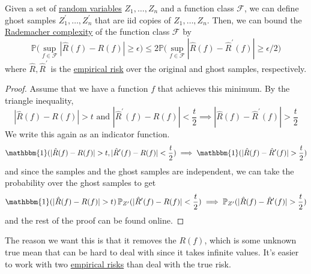   \begin{lemma}
    \label{thm:symmetrization-lemma}
    Given a set of \hyperref[prob-def:random-variable]{random variables} $Z_1, \ldots, Z_n$ and a function class $\mathcal{F}$, we can define ghost samples $Z_1^\prime, \ldots, Z_n^\prime$ that are iid copies of $Z_1, \ldots, Z_n$. Then, we can bound the \hyperref[def:rademacher-complexity]{Rademacher complexity} of the function class $\mathcal{F}$ by 
    \begin{equation}
      \mathbb{P} \bigg( \sup_{f \in \mathcal{F}} | \hat{R} (f) - R(f) | \geq \epsilon \bigg) \leq 2 \mathbb{P} \bigg( \sup_{f \in \mathcal{F}} | \hat{R} (f) - \hat{R}^\prime (f) | \geq \epsilon / 2 \bigg)
    \end{equation}
    where $\hat{R}, \hat{R}^\prime$ is the \hyperref[def:empirical-risk]{empirical risk} over the original and ghost samples, respectively. 
  \end{lemma}
  \begin{proof}
    Assume that we have a function $f$ that achieves this minimum. By the triangle inequality, 
    \begin{equation}
      | \hat{R} (f) - R(f)| > t \text{ and } | \hat{R}^\prime (f) - R(f)| < \frac{t}{2} \implies | \hat{R} (f) - \hat{R}^\prime (f) | > \frac{t}{2}
    \end{equation}
    We write this again as an indicator function. 
    \begin{equation}
      \mathbbm{1} (| \hat{R} (f) - R(f)| > t, | \hat{R}^\prime (f) - R(f)| < \frac{t}{2}) \implies \mathbbm{1} (| \hat{R} (f) - \hat{R}^\prime (f) | > \frac{t}{2})
    \end{equation}
    and since the samples and the ghost samples are independent, we can take the probability over the ghost samples to get 
    \begin{equation}
      \mathbbm{1} (| \hat{R} (f) - R(f)| > t) \, \mathbb{P}_{Z^\prime} (| \hat{R}^\prime (f) - R(f)| < \frac{t}{2}) \implies \mathbb{P}_{Z^\prime} (| \hat{R} (f) - \hat{R}^\prime (f) | > \frac{t}{2})
    \end{equation}
    and the rest of the proof can be found online. 
  \end{proof}

  The reason we want this is that it removes the $R(f)$, which is some unknown true mean that can be hard to deal with since it takes infinite values. It's easier to work with two \hyperref[def:empirical-risk]{empirical risks} than deal with the true risk. 

